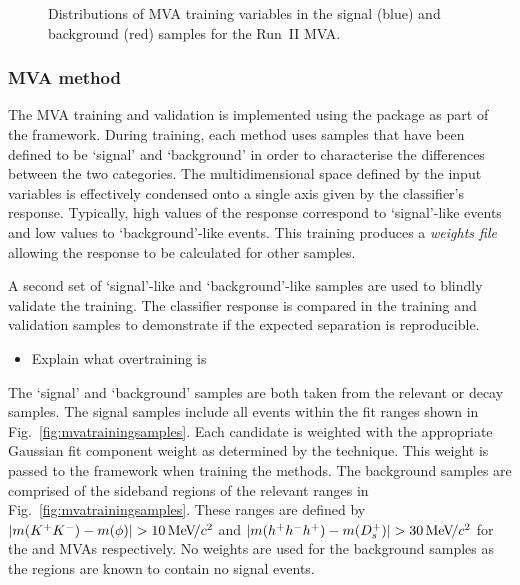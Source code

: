 \begin{figure}[!h]
\begin{subfigure}[t]{0.22\textwidth}
   \end{subfigure}
   \caption{Distributions of MVA training variables in the signal (blue) and background (red) samples for the Run~II \decay{\Dsp}{\Kp\Km\pip} MVA.}
   \label{fig:mvatrainingvariables_Ds}   
\end{figure}


\subsubsection{MVA method}
\label{sec:mvamethod}

The MVA training and validation is implemented using the \tmva package as part of the \root framework.
During training, each method uses samples that have been defined to be `signal' and `background' in order to characterise the differences between the two categories. The multidimensional space defined by the input variables is effectively condensed onto a single axis given by the classifier's response. Typically, high values of the response correspond to `signal'-like events and low values to `background'-like events. This training produces a \emph{weights file} allowing the response to be calculated for other samples. 

A second set of `signal'-like and `background'-like samples are used to blindly validate the training. The classifier response is compared in the training and validation samples to demonstrate if the expected separation is reproducible. 

{\color{Red}
\begin{itemize}
\item Explain what overtraining is
\end{itemize}
}

The `signal' and `background' samples are both taken from the relevant \decay{\Bsb}{\Dsp\pim} or \decay{\Bs}{\jpsi\phiz} decay samples.
The signal samples include all events within the fit ranges shown in Fig.~\ref{fig:mvatrainingsamples}. Each candidate is weighted with the appropriate Gaussian fit component weight as determined by the \sPlot technique. This weight is passed to the \tmva framework when training the methods.
The background samples are comprised of the sideband regions of the relevant ranges in Fig.~\ref{fig:mvatrainingsamples}. These ranges are defined by $|m({{K}^+}{{K}^-})-m(\phi)| > 10 {\mathrm{\,Me\kern -0.1em V\!/}c^2}$ and $|m(h^{+}h^{-}h^{+})-m({{D}^+_{s}})| > 30{\mathrm{\,Me\kern -0.1em V\!/}c^2}$ for the \phiz and \Dsp MVAs respectively. No weights are used for the background samples as the regions are known to contain no signal events.


